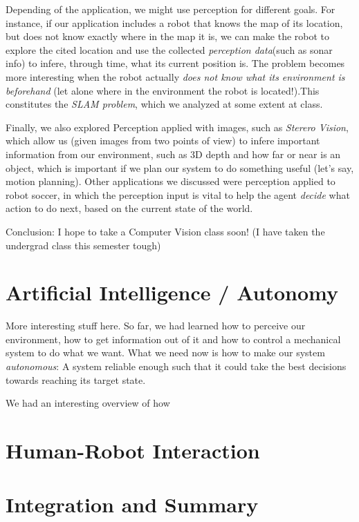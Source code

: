 \documentclass[10pt,a4paper]{article}
\begin{document}
Depending of the application, we might use perception for different goals. For instance, if our application includes a robot that  knows the map of its location, but does not know exactly where in the map it is, we can make the robot to explore the cited location and use the collected \textit{perception data}(such as sonar info) to infere, through time, what its current position is. The problem becomes more interesting when the robot actually \textit{does not know what its environment is beforehand} (let alone where in the environment the robot is located!).This constitutes the \textit{SLAM problem}, which we analyzed at some extent at class.

Finally, we also explored Perception applied with images, such as \textit{Sterero Vision}, which allow us (given images from two points of view) to infere important information from our environment, such as 3D depth and how far or near is an object, which is important if we plan our system to do something useful (let's say, motion planning). Other applications we discussed were perception applied to robot soccer, in which the perception input is vital to help the agent \textit{decide} what action to do next, based on the current state of the world.
\medskip

Conclusion: I hope to take a Computer Vision class soon! (I have taken the undergrad class this semester tough)


\section{Artificial Intelligence / Autonomy}
More interesting stuff here. So far, we had learned how to perceive our environment, how to get information out of it and how to control a mechanical system to do what we want. What we need now is how to make our system \textit{autonomous}: A system reliable enough such that it could take the best decisions towards reaching its target state.

We had an interesting overview of how 

\section{Human-Robot Interaction}

\section{Integration and Summary}
\end{document}
